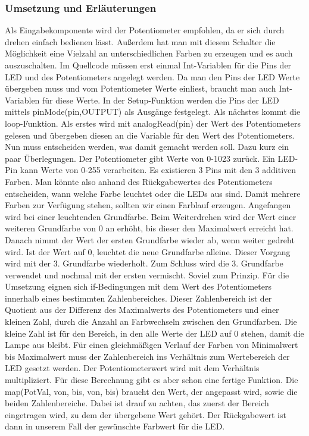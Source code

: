 \subsubsection{Umsetzung und Erläuterungen}
Als Eingabekomponente wird der Potentiometer empfohlen, da er sich durch drehen einfach bedienen lässt. Außerdem hat man mit diesem Schalter die Möglichkeit eine Vielzahl an unterschiedlichen Farben zu erzeugen und es auch auszuschalten. 
Im Quellcode müssen erst einmal Int-Variablen für die Pins der LED und des Potentiometers angelegt werden. Da man den Pins der LED Werte übergeben muss und vom Potentiometer Werte einliest, braucht man auch Int-Variablen für diese Werte.
In der Setup-Funktion werden die Pins der LED mittels pinMode(pin,OUTPUT) als Ausgänge festgelegt.
Als nächstes kommt die loop-Funktion. Als erstes wird mit analogRead(pin) der Wert des Potentiometers gelesen und übergeben diesen an die Variable für den Wert des Potentiometers.
Nun muss entscheiden werden, was damit gemacht werden soll. Dazu kurz ein paar Überlegungen. Der Potentiometer gibt Werte von 0-1023 zurück. Ein LED-Pin kann Werte von 0-255 verarbeiten. Es existieren 3 Pins mit den 3 additiven Farben. Man könnte also anhand des Rückgabewertes des Potentiometers entscheiden, wann welche Farbe leuchtet oder die LEDs aus sind. Damit mehrere Farben zur Verfügung stehen, sollten wir einen Farblauf erzeugen. Angefangen wird bei einer leuchtenden Grundfarbe. Beim Weiterdrehen wird der Wert einer weiteren Grundfarbe von 0 an erhöht, bis dieser den Maximalwert erreicht hat. Danach nimmt der Wert der ersten Grundfarbe wieder ab, wenn weiter gedreht wird. Ist der Wert auf 0, leuchtet die neue Grundfarbe alleine. Dieser Vorgang wird mit der 3. Grundfarbe wiederholt. Zum Schluss wird die 3. Grundfarbe verwendet und nochmal mit der ersten vermischt.
Soviel zum Prinzip. Für die Umsetzung eignen sich if-Bedingungen mit dem Wert des Potentiometers innerhalb eines bestimmten Zahlenbereiches. Dieser Zahlenbereich ist der Quotient aus der Differenz des Maximalwerts des Potentiometers und einer kleinen Zahl, durch die Anzahl an Farbwechseln zwischen den Grundfarben. Die kleine Zahl ist für den Bereich, in den alle Werte der LED auf 0 stehen, damit die Lampe aus bleibt. Für einen gleichmäßigen Verlauf der Farben von Minimalwert bis Maximalwert muss der Zahlenbereich ins Verhältnis zum Wertebereich der LED gesetzt werden. Der Potentiometerwert wird mit dem Verhältnis multipliziert. Für diese Berechnung gibt es aber schon eine fertige Funktion. Die map(PotVal, von, bis, von, bis) braucht den Wert, der angepasst wird, sowie die beiden Zahlenbereiche. Dabei ist drauf zu achten, das zuerst der Bereich eingetragen wird, zu dem der übergebene Wert gehört. Der Rückgabewert ist dann in unserem Fall der gewünschte Farbwert für die LED.

